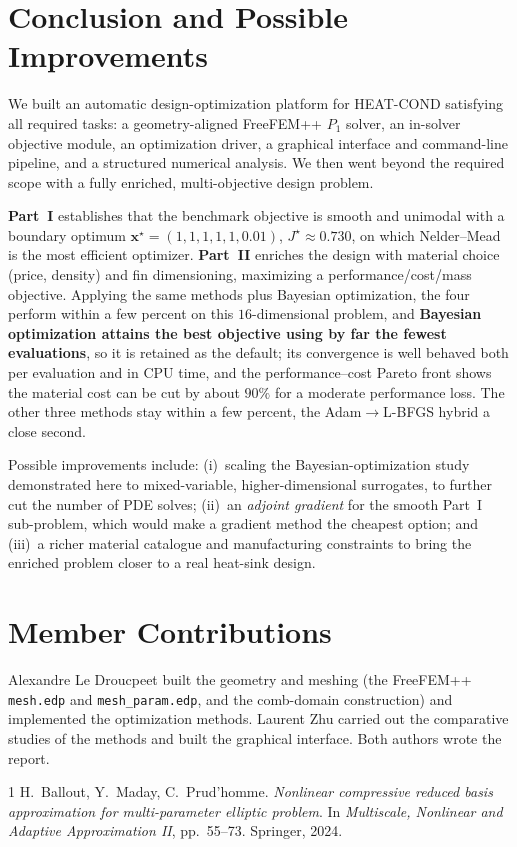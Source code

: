 \documentclass[11pt,a4paper]{article}
\begin{document}
\section{Conclusion and Possible Improvements}
We built an automatic design-optimization platform for HEAT-COND satisfying all required tasks: a
geometry-aligned FreeFEM++ $P_1$ solver, an in-solver objective module, an optimization driver, a
graphical interface and command-line pipeline, and a structured numerical analysis. We then went
beyond the required scope with a fully enriched, multi-objective design problem.

\textbf{Part~I} establishes that the benchmark objective is smooth and unimodal with a boundary optimum
$\mathbf{x}^\star=(1,1,1,1,1,0.01)$, $J^\star\approx0.730$, on which Nelder--Mead is the most efficient
optimizer. \textbf{Part~II} enriches the design with material choice (price, density) and fin
dimensioning, maximizing a performance/cost/mass objective. Applying the same methods plus Bayesian optimization, the four perform within a few percent on this
$16$-dimensional problem, and \textbf{Bayesian optimization attains the best objective using by far the
fewest evaluations}, so it is retained as the default; its convergence is well behaved both per evaluation
and in CPU time, and the performance--cost Pareto front shows the material cost can be cut by about $90\%$
for a moderate performance loss. The other three methods stay within a few percent, the
Adam$\rightarrow$L-BFGS hybrid a close second.

Possible improvements include: (i)~scaling the Bayesian-optimization study demonstrated here to mixed-variable,
higher-dimensional surrogates, to further cut the number of PDE solves; (ii)~an \emph{adjoint gradient} for the
smooth Part~I sub-problem, which would make a gradient method the cheapest option; and (iii)~a richer
material catalogue and manufacturing constraints to bring the enriched problem closer to a real
heat-sink design.

\section*{Member Contributions}
Alexandre Le Droucpeet built the geometry and meshing (the FreeFEM++ \texttt{mesh.edp} and
\texttt{mesh\_param.edp}, and the comb-domain construction) and implemented the optimization methods.
Laurent Zhu carried out the comparative studies of the methods and built the graphical interface.
Both authors wrote the report.

\begin{thebibliography}{1}
 H.~Ballout, Y.~Maday, C.~Prud'homme.
\emph{Nonlinear compressive reduced basis approximation for multi-parameter elliptic problem}.
In \emph{Multiscale, Nonlinear and Adaptive Approximation II}, pp.~55--73. Springer, 2024.
\end{thebibliography}
\end{document}
